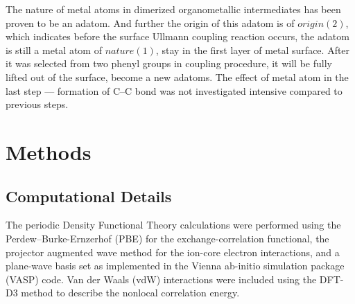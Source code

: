 \documentclass[%
 reprint,
 amsmath,amssymb,
 aps,
prb,
]{revtex4-2}
\begin{document}
The nature of metal atoms in dimerized organometallic intermediates has been proven to be an adatom. And further the origin of this adatom is of $origin(2)$, which indicates before the surface Ullmann coupling reaction occurs, the adatom is still a metal atom of $nature(1)$, stay in the first layer of metal surface. After it was selected from two phenyl groups in coupling procedure, it will be fully lifted out of the surface, become a new adatoms. The effect of metal atom in the last step --- formation of C--C bond was not investigated intensive compared to previous steps.


\section{Methods}



\subsection{Computational Details}

The periodic Density Functional Theory calculations were performed using the Perdew–Burke-Ernzerhof (PBE) for the exchange-correlation functional, the projector augmented wave method for the ion-core electron interactions, and a plane-wave basis set as implemented in the Vienna ab-initio simulation package (VASP) code. Van der Waals (vdW) interactions were included using the DFT-D3 method to describe the nonlocal correlation energy. 
\end{document}
